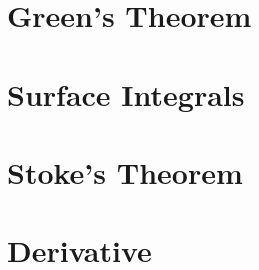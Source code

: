 \documentclass{article}
\theoremstyle{definition}
\begin{document}
\section{Green's Theorem}


\section{Surface Integrals}


\section{Stoke's Theorem}


\section{Derivative}

\end{document}
